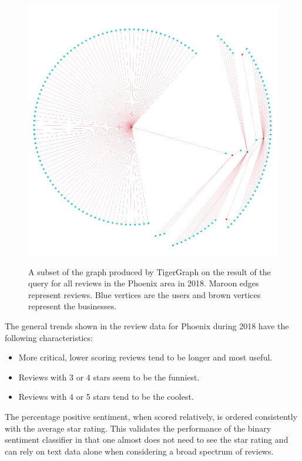 \begin{figure}[h]
    \centering
    \begin{mdframed}[backgroundcolor=gray!70!white, style=GraphFrame]
    {\includegraphics[width=\textwidth]{img/7_graphs/reviewsGraph.png}}
    \end{mdframed}
    \caption{A subset of the graph produced by TigerGraph on the result of the query for all reviews in the Phoenix area in 2018. Maroon edges represent reviews. Blue vertices are the users and brown vertices represent the businesses.}
    \label{fig:reviewGraph}
\end{figure}

The general trends shown in the review data for Phoenix during 2018 have the following characteristics:

\begin{itemize}
    \item More critical, lower scoring reviews tend to be longer and most useful.
    \item Reviews with 3 or 4 stars seem to be the funniest.
    \item Reviews with 4 or 5 stars tend to be the coolest.
\end{itemize}

The percentage positive sentiment, when scored relatively, is ordered consistently with the average star rating. This validates the performance of the binary sentiment classifier in that one almost does not need to see the star rating and can rely on text data alone when considering a broad spectrum of reviews.

